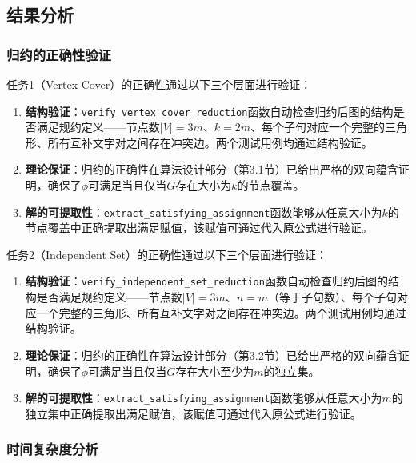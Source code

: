 \documentclass{sysucseexp}
\begin{document}
\subsection{结果分析}

\subsubsection{归约的正确性验证}

任务1（Vertex Cover）的正确性通过以下三个层面进行验证：

\begin{enumerate}
    \item \textbf{结构验证}：\texttt{verify\_vertex\_cover\_reduction}函数自动检查归约后图的结构是否满足规约定义——节点数$|V| = 3m$、$k = 2m$、每个子句对应一个完整的三角形、所有互补文字对之间存在冲突边。两个测试用例均通过结构验证。

    \item \textbf{理论保证}：归约的正确性在算法设计部分（第3.1节）已给出严格的双向蕴含证明，确保了$\phi$可满足当且仅当$G$存在大小为$k$的节点覆盖。

    \item \textbf{解的可提取性}：\texttt{extract\_satisfying\_assignment}函数能够从任意大小为$k$的节点覆盖中正确提取出满足赋值，该赋值可通过代入原公式进行验证。
\end{enumerate}

任务2（Independent Set）的正确性通过以下三个层面进行验证：

\begin{enumerate}
    \item \textbf{结构验证}：\texttt{verify\_independent\_set\_reduction}函数自动检查归约后图的结构是否满足规约定义——节点数$|V| = 3m$、$n = m$（等于子句数）、每个子句对应一个完整的三角形、所有互补文字对之间存在冲突边。两个测试用例均通过结构验证。

    \item \textbf{理论保证}：归约的正确性在算法设计部分（第3.2节）已给出严格的双向蕴含证明，确保了$\phi$可满足当且仅当$G$存在大小至少为$m$的独立集。

    \item \textbf{解的可提取性}：\texttt{extract\_satisfying\_assignment}函数能够从任意大小为$m$的独立集中正确提取出满足赋值，该赋值可通过代入原公式进行验证。
\end{enumerate}

\subsubsection{时间复杂度分析}
\end{document}
